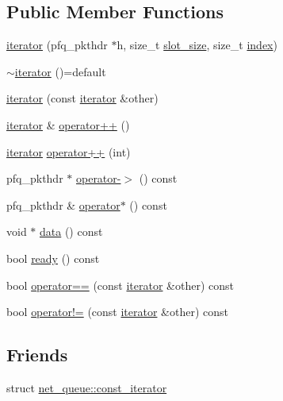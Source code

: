 \subsection*{Public Member Functions}
\begin{DoxyCompactItemize}
\item 
\hyperlink{structpfq_1_1net__queue_1_1iterator_a32b5b8db4f59df4c074e0aafe98c79a5}{iterator} (pfq\+\_\+pkthdr $\ast$h, size\+\_\+t \hyperlink{classpfq_1_1net__queue_a9f745871293123f417a492aa861c13cc}{slot\+\_\+size}, size\+\_\+t \hyperlink{classpfq_1_1net__queue_ab33bdebd885e677a3e079c0193624e52}{index})
\item 
\hyperlink{structpfq_1_1net__queue_1_1iterator_a796f1d97807c57026713f2664bf992bc}{$\sim$iterator} ()=default
\item 
\hyperlink{structpfq_1_1net__queue_1_1iterator_a49a7278fa0b900830b46675c1365d370}{iterator} (const \hyperlink{structpfq_1_1net__queue_1_1iterator}{iterator} \&other)
\item 
\hyperlink{structpfq_1_1net__queue_1_1iterator}{iterator} \& \hyperlink{structpfq_1_1net__queue_1_1iterator_a4e7bf9ea9183af5efd3ade9a50e3350c}{operator++} ()
\item 
\hyperlink{structpfq_1_1net__queue_1_1iterator}{iterator} \hyperlink{structpfq_1_1net__queue_1_1iterator_ad108401f7fd2b6df0fa885ab651cc2fa}{operator++} (int)
\item 
pfq\+\_\+pkthdr $\ast$ \hyperlink{structpfq_1_1net__queue_1_1iterator_ae8bef3a6b332d22fff606e4aeaa6a1d0}{operator-\/$>$} () const 
\item 
pfq\+\_\+pkthdr \& \hyperlink{structpfq_1_1net__queue_1_1iterator_a8ba14cea90784881ea3b31fe0ef33c3c}{operator$\ast$} () const 
\item 
void $\ast$ \hyperlink{structpfq_1_1net__queue_1_1iterator_aa7f321b403fbd77d168478475ae5bd3c}{data} () const 
\item 
bool \hyperlink{structpfq_1_1net__queue_1_1iterator_a878ca2b92a0e25589a8b986c18ff7885}{ready} () const 
\item 
bool \hyperlink{structpfq_1_1net__queue_1_1iterator_a16c662d3c3dc43b6354b78a308376826}{operator==} (const \hyperlink{structpfq_1_1net__queue_1_1iterator}{iterator} \&other) const 
\item 
bool \hyperlink{structpfq_1_1net__queue_1_1iterator_a789cabd61a87acc677d2f565d0c043f4}{operator!=} (const \hyperlink{structpfq_1_1net__queue_1_1iterator}{iterator} \&other) const 
\end{DoxyCompactItemize}
\subsection*{Friends}
\begin{DoxyCompactItemize}
\item 
struct \hyperlink{structpfq_1_1net__queue_1_1iterator_a0fa1c59b5fb1d453f45032bc7a6ea3b0}{net\+\_\+queue\+::const\+\_\+iterator}
\end{DoxyCompactItemize}


